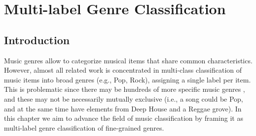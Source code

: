 
\chapter{Multi-label Genre Classification}
\label{sec:multi-class}

\section{Introduction}\label{sec:multi-class:introduction}

Music genres allow to categorize musical items that share common characteristics. %
However, almost all related work is concentrated in multi-class classification of music items into broad genres (e.g., Pop, Rock), assigning a single label per item. This is problematic since there may be hundreds of more specific music genres \citep{pachet2000taxonomy}, and these may not be necessarily mutually exclusive (i.e., a song could be Pop, and at the same time have elements from Deep House and a Reggae grove). 
In this chapter we aim to advance the field of music classification by framing it as multi-label genre classification of fine-grained genres.

